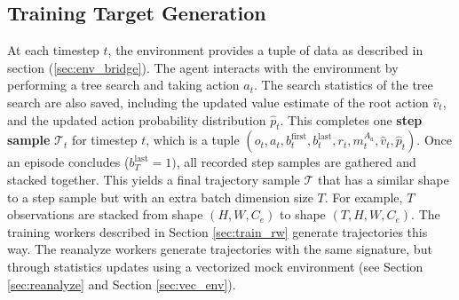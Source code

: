 \subsection{Training Target Generation} \label{sec:targets}
At each timestep $t$, the environment provides a tuple of data as described in section (\ref{sec:env_bridge}).
The agent interacts with the environment by performing a tree search and taking action $a_t$.
The search statistics of the tree search are also saved, including the updated value estimate of the root action $\hat{v}_t$,
and the updated action probability distribution $\hat{p}_t$.
This completes one \textbf{step sample} $\mathcal{T}_t$ for timestep $t$, which is a tuple $(o_t, a_t, b^{\text{first}}_{t}, b^{\text{last}}_{t}, r_t, m^{A_a}_t, \hat{v}_t, \hat{p}_t)$.
Once an episode concludes ($b^{\text{last}}_{T} = 1)$, all recorded step samples are gathered and stacked together.
This yields a final trajectory sample $\mathcal{T}$ that has a similar shape to a step sample but with an extra batch dimension size $T$.
For example, $T$ observations are stacked from shape $(H, W, C_e)$ to shape $(T, H, W, C_e)$.
The training workers described in Section \ref{sec:train_rw} generate trajectories this way.
The reanalyze workers generate trajectories with the same signature, but through statistics updates  using a vectorized mock environment (see Section \ref{sec:reanalyze} and Section \ref{sec:vec_env}).


